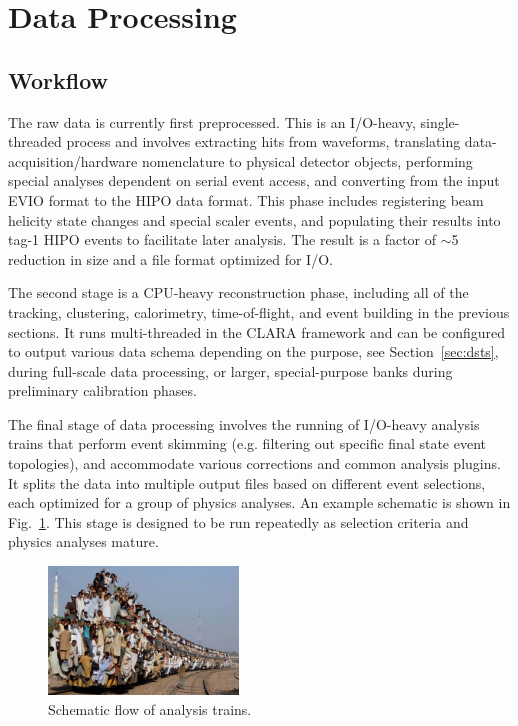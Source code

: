 \section{Data Processing}
\label{sec:dataproc}

\subsection{Workflow}

The raw data is currently first preprocessed.  This is an I/O-heavy, single-threaded process and involves
extracting hits from waveforms, translating data-acquisition/hardware nomenclature to physical detector objects,
performing special analyses dependent on serial event access, and converting from the input EVIO format to the
HIPO data format.  This phase includes registering beam helicity state changes and special scaler events, and
populating their results into tag-1 HIPO events to facilitate later analysis.  The result is a factor of $\sim$5
reduction in size and a file format optimized for I/O.

The second stage is a CPU-heavy reconstruction phase, including all of the tracking, clustering, calorimetry,
time-of-flight, and event building in the previous sections.  It runs multi-threaded in the CLARA framework and
can be configured to output various data schema depending on the purpose, see Section~\ref{sec:dsts}, during
full-scale data processing, or larger, special-purpose banks during preliminary calibration phases.

The final stage of data processing involves the running of I/O-heavy analysis trains that perform event skimming
(e.g. filtering out specific final state event topologies),  and accommodate various corrections and common analysis
plugins.  It splits the data into multiple output files based on different event selections, each optimized for a
group of physics analyses. An example schematic is shown in Fig.~\ref{fig:train}. This stage is designed to be run
repeatedly as selection criteria and physics analyses mature.

\begin{figure}
    \includegraphics[width=0.45\textwidth,height=0.2\textheight]{pics/train.jpg}
    \caption{Schematic flow of analysis trains.\label{fig:train}}
\end{figure}

